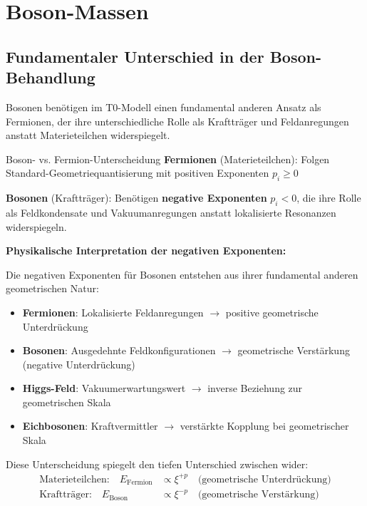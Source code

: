 \documentclass[12pt,a4paper]{article}
\begin{document}
	\section{Boson-Massen}
	\label{sec:boson_masses}
	
	\subsection{Fundamentaler Unterschied in der Boson-Behandlung}
	\label{subsec:boson_difference}
	
	Bosonen benötigen im T0-Modell einen fundamental anderen Ansatz als Fermionen, der ihre unterschiedliche Rolle als Kraftträger und Feldanregungen anstatt Materieteilchen widerspiegelt.
	
	\begin{important}{Boson- vs. Fermion-Unterscheidung}{}
		\textbf{Fermionen} (Materieteilchen): Folgen Standard-Geometriequantisierung mit positiven Exponenten $p_i \geq 0$
		
		\textbf{Bosonen} (Kraftträger): Benötigen \textbf{negative Exponenten} $p_i < 0$, die ihre Rolle als Feldkondensate und Vakuumanregungen anstatt lokalisierte Resonanzen widerspiegeln.
	\end{important}
	
	\textbf{Physikalische Interpretation der negativen Exponenten:}
	
	Die negativen Exponenten für Bosonen entstehen aus ihrer fundamental anderen geometrischen Natur:
	
	\begin{itemize}
		\item \textbf{Fermionen}: Lokalisierte Feldanregungen $\rightarrow$ positive geometrische Unterdrückung
		\item \textbf{Bosonen}: Ausgedehnte Feldkonfigurationen $\rightarrow$ geometrische Verstärkung (negative Unterdrückung)
		\item \textbf{Higgs-Feld}: Vakuumerwartungswert $\rightarrow$ inverse Beziehung zur geometrischen Skala
		\item \textbf{Eichbosonen}: Kraftvermittler $\rightarrow$ verstärkte Kopplung bei geometrischer Skala
	\end{itemize}
	
	Diese Unterscheidung spiegelt den tiefen Unterschied zwischen wider:
	\begin{align}
		\text{Materieteilchen:} \quad E_{\text{Fermion}} &\propto \xi^{+p} \quad \text{(geometrische Unterdrückung)} \\
		\text{Kraftträger:} \quad E_{\text{Boson}} &\propto \xi^{-p} \quad \text{(geometrische Verstärkung)}
	\end{align}
	
\end{document}
